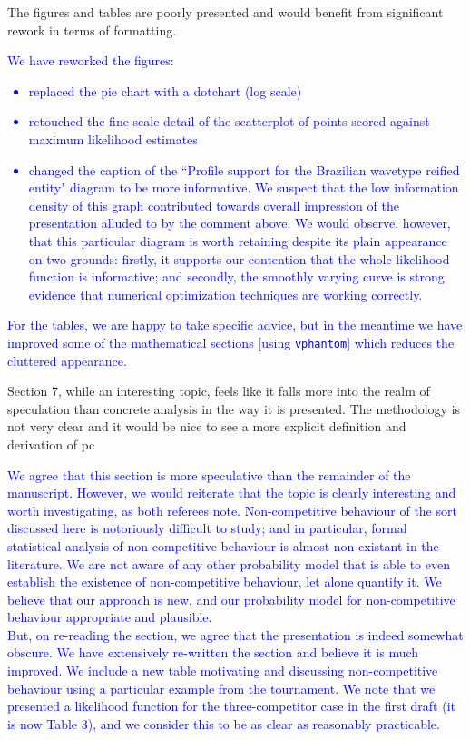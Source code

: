 \documentclass[12pt]{article}
\begin{document}
  
The figures and tables are poorly presented and would benefit from
significant rework in terms of formatting.

\textcolor{blue}{We have reworked the figures:
  \begin{itemize}
  \item replaced the pie chart with a dotchart (log scale)
  \item retouched the fine-scale detail of the scatterplot of points scored 
    against maximum likelihood estimates
  \item changed the caption of the ``Profile support for the Brazilian
    wavetype reified entity" diagram to be more informative.  We
    suspect that the low information density of this graph contributed
    towards overall impression of the presentation alluded to by the
    comment above.  We would observe, however, that this particular
    diagram is worth retaining despite its plain appearance on two
    grounds: firstly, it supports our contention that the whole
    likelihood function is informative; and secondly, the smoothly
    varying curve is strong evidence that numerical optimization
    techniques are working correctly.
  \end{itemize}
  For the tables, we are happy to take specific advice, but in the
  meantime we have improved  some of the mathematical sections [using
    {\tt vphantom}] which reduces the cluttered appearance.
}

Section 7, while an interesting topic, feels like it falls more into
the realm of speculation than concrete analysis in the way it is
presented. The methodology is not very clear and it would be nice to
see a more explicit definition and derivation of pc

\textcolor{blue}{We agree that this section is more speculative than
  the remainder of the manuscript.  However, we would reiterate that
  the topic is clearly interesting and worth investigating, as both
  referees note.  Non-competitive behaviour of the sort discussed here
  is notoriously difficult to study; and in particular, formal
  statistical analysis of non-competitive behaviour is almost
  non-existant in the literature.  We are not aware of any other
  probability model that is able to even establish the existence of
  non-competitive behaviour, let alone quantify it.  We believe that
  our approach is new, and our probability model for non-competitive
  behaviour appropriate and plausible.\\ But, on re-reading the
  section, we agree that the presentation is indeed somewhat obscure.
  We have extensively re-written the section and believe it is much
  improved.  We include a new table motivating and discussing
  non-competitive behaviour using a particular example from the
  tournament.  We note that we presented a likelihood function for the
  three-competitor case in the first draft (it is now Table 3), and we
  consider this to be as clear as reasonably practicable.}
\end{document}
